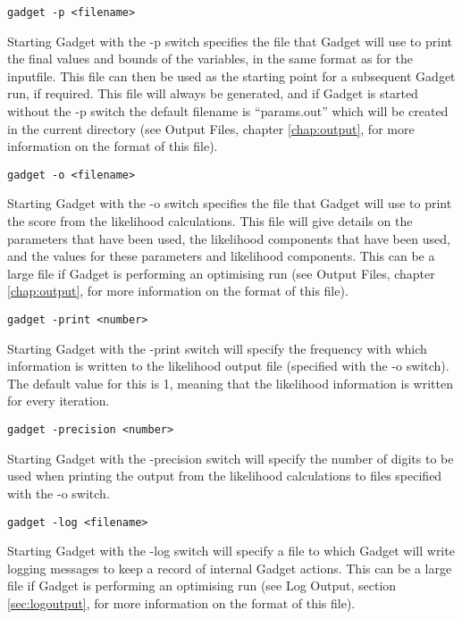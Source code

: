 \documentclass[]{book}
\begin{document}
\begin{verbatim}
gadget -p <filename>
\end{verbatim}

Starting Gadget with the -p switch specifies the file that Gadget will
use to print the final values and bounds of the variables, in the same
format as for the inputfile. This file can then be used as the starting
point for a subsequent Gadget run, if required. This file will always be
generated, and if Gadget is started without the -p switch the default
filename is ``params.out'' which will be created in the current directory
(see Output Files, chapter \ref{chap:output}, for more information on the format of this
file).

\begin{verbatim}
gadget -o <filename>
\end{verbatim}

Starting Gadget with the -o switch specifies the file that Gadget will
use to print the score from the likelihood calculations. This file will
give details on the parameters that have been used, the likelihood
components that have been used, and the values for these parameters and
likelihood components. This can be a large file if Gadget is performing
an optimising run (see Output Files,
chapter \ref{chap:output}, for more information on the format of this
file).

\begin{verbatim}
gadget -print <number>
\end{verbatim}

Starting Gadget with the -print switch will specify the frequency with
which information is written to the likelihood output file (specified
with the -o switch). The default value for this is 1, meaning that the
likelihood information is written for every iteration.

\begin{verbatim}
gadget -precision <number>
\end{verbatim}

Starting Gadget with the -precision switch will specify the number of
digits to be used when printing the output from the likelihood
calculations to files specified with the -o switch.

\begin{verbatim}
gadget -log <filename>
\end{verbatim}

Starting Gadget with the -log switch will specify a file to which Gadget
will write logging messages to keep a record of internal Gadget actions.
This can be a large file if Gadget is performing an optimising run (see
Log Output, section \ref{sec:logoutput}, for more information on the format of this
file).
\end{document}
